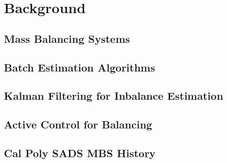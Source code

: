 \chapter{Background}\label{chap:background}
\section{Mass Balancing Systems}

\section{Batch Estimation Algorithms}

\section{Kalman Filtering for Inbalance Estimation}

\section{Active Control for Balancing}

\section{Cal Poly SADS MBS History}